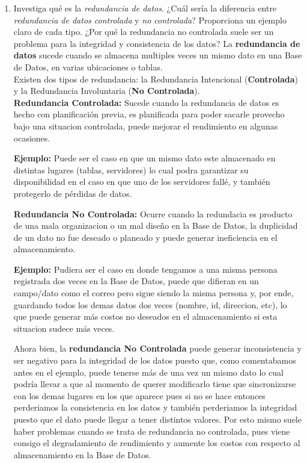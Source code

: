 \documentclass[12pt]{report}
\begin{document}
\begin{enumerate}[label=\textbf{\arabic*.}, leftmargin=*]
\begin{enumerate}[label=\textbf{\alph*.}, leftmargin=*, itemsep=1.0em]
\item Investiga qu\'e es la \textit{redundancia de datos}. ¿Cu\'al ser\'ia la diferencia entre \textit{redundancia de datos controlada} y \textit{no controlada}? Proporciona un ejemplo claro de cada tipo. ¿Por qu\'e la redundancia no controlada suele ser un problema para la integridad y consistencia de los datos?
La \textbf{redundancia de datos} sucede cuando se almacena multiples veces un mismo dato en una Base de Datos, en varias ubicaciones o tablas.\\
Existen dos tipos de redundancia: la Redundancia Intencional (\textbf{Controlada}) y la Redundancia Involuntaria (\textbf{No Controlada}).\\
\textbf{Redundancia Controlada:} Sucede cuando la redundancia de datos es hecho con planificación previa, es planificada para poder sacarle provecho bajo una situacion controlada, puede mejorar el rendimiento en algunas ocasiones.

 \hspace{0.3cm}\textbf{Ejemplo:} Puede ser el caso en que un mismo dato este almacenado en distintas lugares (tablas, servidores) lo cual podra garantizar su disponibilidad  en el caso en que uno de los servidores fallé, y también protegerlo de pérdidas de datos.

\textbf{Redundancia No Controlada:} Ocurre cuando la redundacia es producto de una mala organizacion o un mal diseño en la Base de Datos, la duplicidad de un dato no fue deseado o planeado y puede generar ineficiencia en el almacenamiento.

 \hspace{0.3cm}\textbf{Ejemplo:} Pudiera ser el caso en donde tengamos a una misma persona registrada dos veces en la Base de Datos, puede que difieran en un campo/dato como el correo pero sigue siendo la misma persona y, por ende, guardando todos los demas datos dos veces (nombre, id, direccion, etc), lo que puede generar más costos no deseados en el almacenamiento si esta situacion sudece más veces.

 Ahora bien, la \textbf{redundancia No Controlada} puede generar inconsistencia y ser negativo para la integridad de los datos puesto que, como comentabamos antes en el ejemplo, puede tenerse más de una vez un mismo dato lo cual podría llevar a que al momento de querer modificarlo tiene que sincronizarse con los demas lugares en los que aparece pues si no se hace entonces perderiamos la consistencia en los datos y también perderiamos la integridad puesto que el dato puede llegar a tener distintos valores. Por esto mismo suele haber problemas cuando se trata de redundancia no controlada, pues viene consigo el degradamiento de rendimiento y aumente los costos con respecto al almacenamiento en la Base de Datos.



\end{enumerate}
\end{enumerate}
\end{document}
